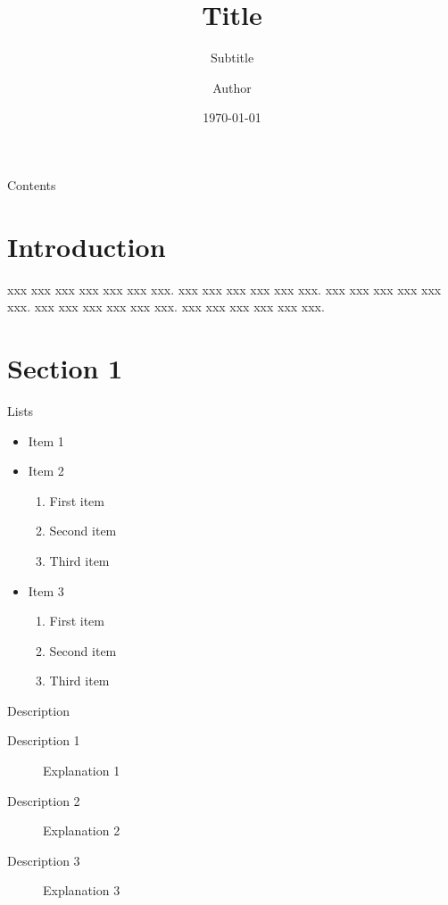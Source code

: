 \documentclass[compress,aspectratio=43]{beamer}
\title{Title}
\subtitle{Subtitle}
\author{Author}
\date{\today}
\institute[XXXX]{University of XXXX}
\begin{document}
\begin{frame}[plain]
    \titlepage
\end{frame}

\begin{frame}{Contents}
    \tableofcontents[sectionstyle=show,subsectionstyle=show/shaded/hide,
        subsubsectionstyle=show/shaded/hide]
\end{frame}

\section{Introduction}

\begin{frame}
    xxx xxx xxx xxx xxx xxx xxx.
    xxx xxx xxx xxx xxx xxx.
    xxx xxx xxx xxx xxx xxx.
    xxx xxx xxx xxx xxx xxx.
    xxx xxx xxx xxx xxx xxx.
\end{frame}

\section{Section 1}

\begin{frame}{Lists}
    \begin{itemize}
        \item Item 1
        \item Item 2
              \begin{enumerate}
                  \item First item
                  \item Second item
                  \item Third item
              \end{enumerate}
        \item Item 3
              \begin{enumerate}
                  \item First item
                  \item Second item
                  \item Third item
              \end{enumerate}
    \end{itemize}
\end{frame}

\begin{frame}{Description}
    \begin{description}
        \item[Description 1] Explanation 1
        \item[Description 2] Explanation 2
        \item[Description 3] Explanation 3
    \end{description}
\end{frame}
\end{document}
